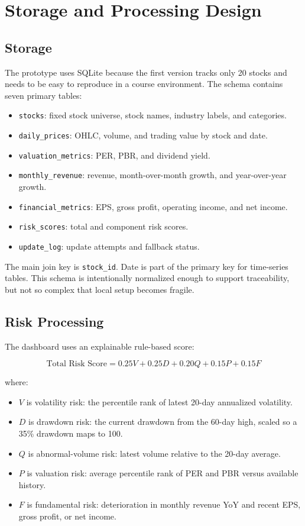 \section{Storage and Processing Design}
\label{sec:storage-processing}

\subsection{Storage}

The prototype uses SQLite because the first version tracks only 20 stocks and needs to be easy to reproduce in a course environment. The schema contains seven primary tables:

\begin{itemize}
    \item \texttt{stocks}: fixed stock universe, stock names, industry labels, and categories.
    \item \texttt{daily\_prices}: OHLC, volume, and trading value by stock and date.
    \item \texttt{valuation\_metrics}: PER, PBR, and dividend yield.
    \item \texttt{monthly\_revenue}: revenue, month-over-month growth, and year-over-year growth.
    \item \texttt{financial\_metrics}: EPS, gross profit, operating income, and net income.
    \item \texttt{risk\_scores}: total and component risk scores.
    \item \texttt{update\_log}: update attempts and fallback status.
\end{itemize}

The main join key is \texttt{stock\_id}. Date is part of the primary key for time-series tables. This schema is intentionally normalized enough to support traceability, but not so complex that local setup becomes fragile.

\subsection{Risk Processing}

The dashboard uses an explainable rule-based score:

\[
\text{Total Risk Score} =
0.25V + 0.25D + 0.20Q + 0.15P + 0.15F
\]

where:

\begin{itemize}
    \item $V$ is volatility risk: the percentile rank of latest 20-day annualized volatility.
    \item $D$ is drawdown risk: the current drawdown from the 60-day high, scaled so a 35\% drawdown maps to 100.
    \item $Q$ is abnormal-volume risk: latest volume relative to the 20-day average.
    \item $P$ is valuation risk: average percentile rank of PER and PBR versus available history.
    \item $F$ is fundamental risk: deterioration in monthly revenue YoY and recent EPS, gross profit, or net income.
\end{itemize}

